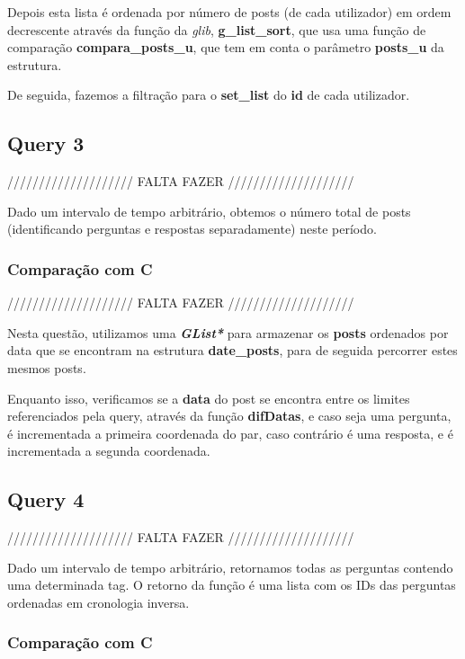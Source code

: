 \documentclass[a4paper]{article}
\begin{document}
Depois esta lista é ordenada por número de posts (de cada utilizador)
em ordem decrescente através da função da \textit{glib}, 
\textbf{g\_list\_sort}, que usa uma função de comparação 
\textbf{compara\_posts\_u}, que tem em conta o parâmetro
\textbf{posts\_u} da estrutura.

De seguida, fazemos a filtração para o \textbf{set\_list} do 
\textbf{id} de cada utilizador.

\subsection{Query 3}

//////////////////// FALTA FAZER ////////////////////

Dado um intervalo de tempo arbitrário, obtemos o número total de posts 
(identificando perguntas e respostas separadamente) neste período.

\subsubsection{Comparação com C}

//////////////////// FALTA FAZER ////////////////////

Nesta questão, utilizamos uma \textit{\textbf{GList*}} para armazenar 
os \textbf{posts} ordenados por data que se encontram na estrutura 
\textbf{date\_posts}, para de seguida percorrer estes mesmos posts.

Enquanto isso, verificamos se a \textbf{data} do post se encontra entre 
os limites referenciados pela query, através da função \textbf{difDatas},
e caso seja uma pergunta, é incrementada a primeira coordenada do par,
caso contrário é uma resposta, e é incrementada a segunda coordenada.

\subsection{Query 4}

//////////////////// FALTA FAZER ////////////////////

Dado um intervalo de tempo arbitrário, retornamos todas as perguntas 
contendo uma determinada tag. O retorno da função é uma lista com os IDs 
das perguntas ordenadas em cronologia inversa.

\subsubsection{Comparação com C}
\end{document}
